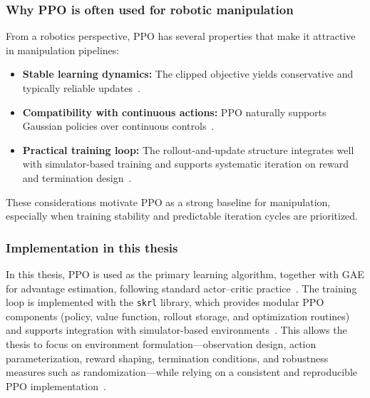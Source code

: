\subsubsection{Why PPO is often used for robotic manipulation}
\label{sec:ppo_for_manipulation}

From a robotics perspective, \ac{PPO} has several properties that make it attractive in manipulation pipelines:
\begin{itemize}
  \item \textbf{Stable learning dynamics:} The clipped objective yields conservative and typically reliable updates~\cite{Schulman2017PPO}.
  \item \textbf{Compatibility with continuous actions:} \ac{PPO} naturally supports Gaussian policies over continuous controls~\cite{SuttonBarto2018}.
  \item \textbf{Practical training loop:} The rollout-and-update structure integrates well with simulator-based training and
  supports systematic iteration on reward and termination design~\cite{Kober2013Survey}.
\end{itemize}
These considerations motivate \ac{PPO} as a strong baseline for manipulation, especially when training stability and predictable
iteration cycles are prioritized.

\subsubsection{Implementation in this thesis}
\label{sec:rl_implementation_thesis}

In this thesis, \ac{PPO} is used as the primary learning algorithm, together with \ac{GAE} for advantage estimation, following
standard actor--critic practice~\cite{Schulman2015GAE,Schulman2017PPO}.
The training loop is implemented with the \texttt{skrl} library, which provides modular \ac{PPO} components (policy, value function,
rollout storage, and optimization routines) and supports integration with simulator-based environments~\cite{SerranoMunoz2023skrl}.
This allows the thesis to focus on environment formulation---observation design, action parameterization, reward shaping,
termination conditions, and robustness measures such as randomization---while relying on a consistent and reproducible \ac{PPO}
implementation~\cite{SerranoMunoz2023skrl}.

